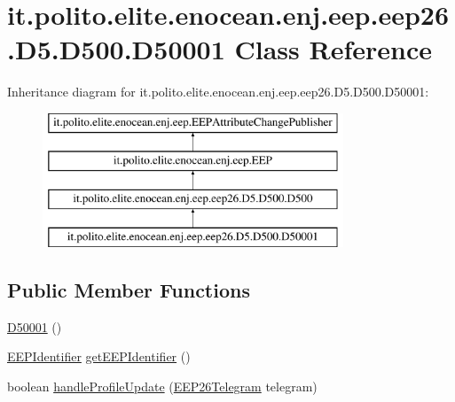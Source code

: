 \hypertarget{classit_1_1polito_1_1elite_1_1enocean_1_1enj_1_1eep_1_1eep26_1_1_d5_1_1_d500_1_1_d50001}{}\section{it.\+polito.\+elite.\+enocean.\+enj.\+eep.\+eep26.\+D5.\+D500.\+D50001 Class Reference}
\label{classit_1_1polito_1_1elite_1_1enocean_1_1enj_1_1eep_1_1eep26_1_1_d5_1_1_d500_1_1_d50001}
Inheritance diagram for it.\+polito.\+elite.\+enocean.\+enj.\+eep.\+eep26.\+D5.\+D500.\+D50001\+:\begin{figure}[H]
\begin{center}
\leavevmode
\includegraphics[height=4.000000cm]{classit_1_1polito_1_1elite_1_1enocean_1_1enj_1_1eep_1_1eep26_1_1_d5_1_1_d500_1_1_d50001}
\end{center}
\end{figure}
\subsection*{Public Member Functions}
\begin{DoxyCompactItemize}
\item 
\hyperlink{classit_1_1polito_1_1elite_1_1enocean_1_1enj_1_1eep_1_1eep26_1_1_d5_1_1_d500_1_1_d50001_aa5e0d90eda0e78ca2c616237b1b536f4}{D50001} ()
\item 
\hyperlink{classit_1_1polito_1_1elite_1_1enocean_1_1enj_1_1eep_1_1_e_e_p_identifier}{E\+E\+P\+Identifier} \hyperlink{classit_1_1polito_1_1elite_1_1enocean_1_1enj_1_1eep_1_1eep26_1_1_d5_1_1_d500_1_1_d50001_aeec49085ef79faafac0e9b3b2d19d259}{get\+E\+E\+P\+Identifier} ()
\item 
boolean \hyperlink{classit_1_1polito_1_1elite_1_1enocean_1_1enj_1_1eep_1_1eep26_1_1_d5_1_1_d500_1_1_d50001_ad5eca374f9561f4974bda20b6e9fdd72}{handle\+Profile\+Update} (\hyperlink{classit_1_1polito_1_1elite_1_1enocean_1_1enj_1_1eep_1_1eep26_1_1telegram_1_1_e_e_p26_telegram}{E\+E\+P26\+Telegram} telegram)
\end{DoxyCompactItemize}
